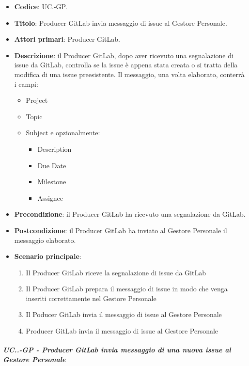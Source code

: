 		\begin{itemize}
			\item \textbf{Codice}: UC\theuccount.\thesubuccount-GP.
			\item \textbf{Titolo}:  Producer GitLab invia messaggio di issue al Gestore Personale.
			\item \textbf{Attori primari}: Producer GitLab.
			\item \textbf{Descrizione}: il Producer GitLab, dopo aver ricevuto una segnalazione di issue da GitLab, controlla se la issue è appena stata creata o si tratta della modifica di una issue preesistente. Il messaggio, una volta elaborato, conterrà i campi:
			\begin{itemize}
				\item Project
				\item Topic
				\item Subject e opzionalmente:
				\begin{itemize}
					\item Description
					\item Due Date
					\item Milestone
					\item Assignee
				\end{itemize}
			\end{itemize}
			\item \textbf{Precondizione}: il Producer GitLab ha ricevuto una segnalazione da GitLab.
			\item \textbf{Postcondizione}: il Producer GitLab ha inviato al Gestore Personale il messaggio elaborato.
			\item \textbf{Scenario principale}: 
			\begin{enumerate}
				\item Il Producer GitLab riceve la segnalazione di issue da GitLab
				\item Il Producer GitLab prepara il messaggio di issue in modo che venga inseriti correttamente nel Gestore Personale
				\item Il Poducer GitLab invia il messaggio di issue al Gestore Personale
				\item Producer GitLab invia il messaggio di issue al Gestore Personale
			\end{enumerate}
			
		\end{itemize}
		
		\subparagraph{UC\theuccount.\thesubuccount.\thesubsubuccount-GP - Producer GitLab invia messaggio di una nuova issue al Gestore Personale}
			
